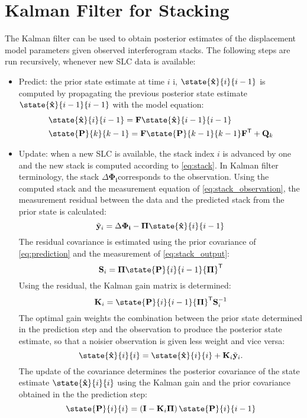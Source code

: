 \documentclass{article}
\begin{document}
\section{Kalman Filter for Stacking}
The Kalman filter can be used to obtain posterior estimates of the displacement model parameters given  observed interferogram stacks. The following steps are run recursively, whenever new SLC data is available:
\begin{itemize}
	\item Predict: the prior state estimate at time $i$ i, $\state{\mathbf{\hat{x}}}{i}{i-1}$ is computed by propagating the  previous posterior state estimate $\state{\mathbf{\hat{x}}}{i-1}{i-1}$ with the model equation:
	\begin{align}\label{eq:prediction}
		&\state{\mathbf{\hat{x}}}{i}{i-1} = \mathbf{F} \state{\mathbf{\hat{x}}}{i-1}{i-1}\\
		&\state{\mathbf{P}}{k}{k-1} = \mathbf{F} \state{\mathbf{P}}{k-1}{k-1} \mathbf{F}^\mathsf{T} + \mathbf{Q}_{k}
	\end{align}
	\item Update: when a new SLC is available, the stack index $i$ is advanced by one and the new stack is computed according to \autoref{eq:stack}. In Kalman filter terminology, the stack $\Delta\mathbf{\Phi_i} $corresponds to the observation. Using the computed stack and the measurement equation of \autoref{eq:stack_observation}, the measurement residual  between the data and the predicted stack from the prior state is calculated:
	\begin{equation}
		\tilde{\mathbf{y}}_i = \Delta\mathbf{\Phi_i} - \mathbf{\Pi} \state{\mathbf{\hat{x}}}{i}{i-1}
	\end{equation}
	The residual covariance is estimated using the prior covariance of \autoref{eq:prediction}  and the measurement of \autoref{eq:stack_output}:
	\begin{equation}
		\mathbf{S}_i = \mathbf{\Pi} \state{\mathbf{P}}{i}{i-1}{\mathbf{\Pi}}^\mathsf{T}
	\end{equation}
	Using the residual, the Kalman gain matrix is determined:
	\begin{equation}
		\mathbf{K}_i = \state{\mathbf{P}}{i}{i-1}{\mathbf{\Pi}}^\mathsf{T}\mathbf{S}_i^{-1}
	\end{equation}
	The optimal gain weights the  combination between the prior state determined in the prediction step and the observation to produce the posterior state estimate, so that 
	a noisier observation is given less weight and vice versa:
	\begin{equation}
		\state{\mathbf{\hat{x}}}{i}{i} = \state{\mathbf{\hat{x}}}{i}{i} + \mathbf{K}_i \tilde{\mathbf{y}}_i.
	\end{equation}
	The update of the covariance determines the posterior covariance of the state estimate $\state{\mathbf{\hat{x}}}{i}{i}$ using the Kalman gain and the prior covariance obtained in the the prediction step:
	\begin{equation}
	\state{\mathbf{P}}{i}{i} = \left(\mathbf{I} - \mathbf{K}_i\mathbf{\Pi}\right)\state{\mathbf{P}}{i}{i-1}
	\end{equation}
\end{itemize}
\end{document}
